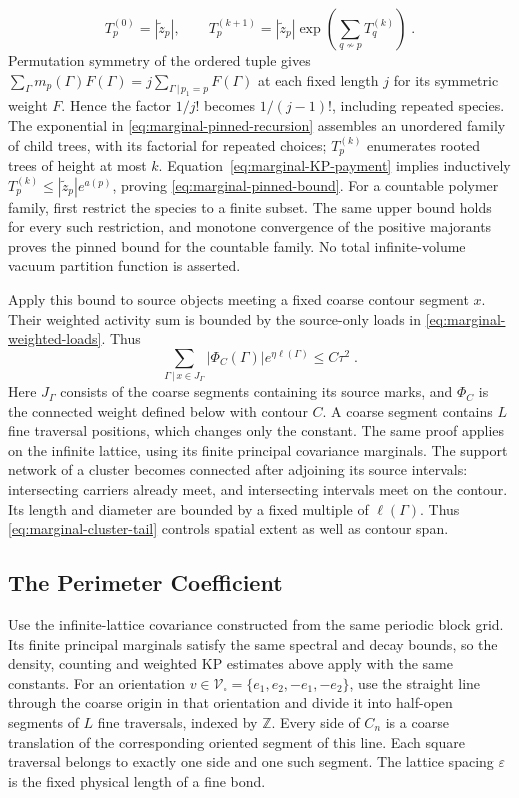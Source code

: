 \documentclass[11pt]{article}
\begin{document}
\begin{equation}\label{eq:marginal-pinned-recursion}
    T_p^{(0)}=|\widetilde z_p|,
    \qquad
    T_p^{(k+1)}=|\widetilde z_p|
        \exp\left(\sum_{q\not \sim p}T_q^{(k)}\right)\;.
\end{equation}
Permutation symmetry of the ordered tuple gives $\sum_\Gamma m_p(\Gamma)F(\Gamma)=j\sum_{\Gamma\, | \,p_1=p}F(\Gamma)$ at each fixed length $j$ for its symmetric weight $F$. Hence the factor $1/j!$ becomes $1/(j-1)!$, including repeated species. The exponential in \eqref{eq:marginal-pinned-recursion} assembles an unordered family of child trees, with its factorial for repeated choices; $T_p^{(k)}$ enumerates rooted trees of height at most $k$. Equation~\eqref{eq:marginal-KP-payment} implies inductively $T_p^{(k)}\leq |\widetilde z_p|e^{a(p)}$, proving \eqref{eq:marginal-pinned-bound}. For a countable polymer family, first restrict the species to a finite subset. The same upper bound holds for every such restriction, and monotone convergence of the positive majorants proves the pinned bound for the countable family. No total infinite-volume vacuum partition function is asserted.

Apply this bound to source objects meeting a fixed coarse contour segment $x$. Their weighted activity sum is bounded by the source-only loads in \eqref{eq:marginal-weighted-loads}. Thus
\begin{equation}\label{eq:marginal-cluster-tail}
    \sum_{\Gamma\, | \,x\in J_\Gamma}
        |\Phi_C(\Gamma)|e^{\eta\ell(\Gamma)}
        \leq C\tau^2\;.
\end{equation}
Here $J_\Gamma$ consists of the coarse segments containing its source marks, and $\Phi_C$ is the connected weight defined below with contour $C$. A coarse segment contains $L$ fine traversal positions, which changes only the constant. The same proof applies on the infinite lattice, using its finite principal covariance marginals. The support network of a cluster becomes connected after adjoining its source intervals: intersecting carriers already meet, and intersecting intervals meet on the contour. Its length and diameter are bounded by a fixed multiple of $\ell(\Gamma)$. Thus \eqref{eq:marginal-cluster-tail} controls spatial extent as well as contour span.

\subsection{The Perimeter Coefficient}

Use the infinite-lattice covariance constructed from the same periodic block grid. Its finite principal marginals satisfy the same spectral and decay bounds, so the density, counting and weighted KP estimates above apply with the same constants. For an orientation $v\in \mathscr V_\square=\{e_1,e_2,-e_1,-e_2\}$, use the straight line through the coarse origin in that orientation and divide it into half-open segments of $L$ fine traversals, indexed by $\mathbb Z$. Every side of $C_n$ is a coarse translation of the corresponding oriented segment of this line. Each square traversal belongs to exactly one side and one such segment. The lattice spacing $\varepsilon$ is the fixed physical length of a fine bond.
\end{document}
